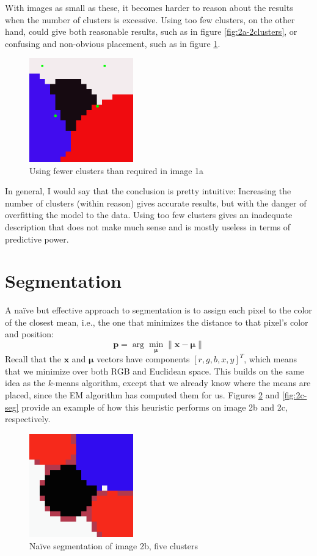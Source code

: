 \documentclass[letterpaper, 10pt, twocolumn]{article}
\numberwithin{theorem}{section}
\begin{document}
With images as small as these, it becomes harder to reason about the results when the number of clusters is excessive. 
Using too few clusters, on the other hand, could give both reasonable results, such as in figure \ref{fig:2a-2clusters}, or  confusing and non-obvious placement, such as in figure \ref{fig:1a-2clusters}.

\begin{figure}[h]
	\centering
	\includegraphics[width=0.4\textwidth]{1a-2clusters}
	\caption{Using fewer clusters than required in image 1a}
	\label{fig:1a-2clusters}
\end{figure}

In general, I would say that the conclusion is pretty intuitive: 
Increasing the number of clusters (within reason) gives accurate results, but with the danger of overfitting the model to the data. 
Using too few clusters gives an inadequate description that does not make much sense and is mostly useless in terms of predictive power.




\section{Segmentation}
A naïve but effective approach to segmentation is to assign each pixel to the color of the closest mean, i.e., the one that minimizes the  distance to that pixel's color and position:
\[
	\mathbf{p} = \arg \min_{\boldsymbol{\mu}} \| \mathbf{x} - \boldsymbol{\mu} \|
\]
Recall that the $\mathbf{x}$ and $\boldsymbol{\mu}$ vectors have components $[r, g, b, x, y]^T$, which means that we minimize over both RGB and Euclidean space. 
This builds on the same idea as the $k$-means algorithm, except that we already know where the means are placed, since the EM algorithm has computed them for us.
Figures \ref{fig:2b-seg} and \ref{fig:2c-seg} provide an example of how this heuristic performs on image 2b and 2c, respectively.

\begin{figure}[h]
	\centering
	\includegraphics[width=0.4\textwidth]{2b-seg}
	\caption{Naïve segmentation of image 2b, five clusters}
	\label{fig:2b-seg}
\end{figure}
\end{document}

